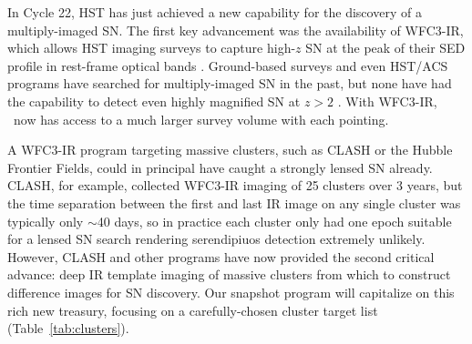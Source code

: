 \medskip
{} In Cycle 22, HST has just achieved a new capability for the discovery of a multiply-imaged SN. The first key advancement was the
availability of WFC3-IR, which allows HST imaging surveys to capture
high-$z$ SN at the peak of their SED profile in rest-frame optical
bands \citep{Rodney:2012,Jones:2013}.  Ground-based surveys and even
HST/ACS programs have searched for multiply-imaged SN in the past, but
none have had the capability to detect even highly magnified SN at
$z>2$ \citep[e.g.][]{Dawson:2009,Sharon:2010,Sand:2011}.  With
WFC3-IR, \Hubble\ now has access to a much larger survey volume with
each pointing.

A WFC3-IR program targeting massive clusters, such as CLASH or the
Hubble Frontier Fields, could in principal have caught a strongly
lensed SN already.  CLASH, for example, collected
WFC3-IR imaging of 25 clusters over 3 years, but the time separation
between the first and last IR image on any single cluster was
typically only $\sim$40 days, so in practice each cluster only had one
epoch suitable for a lensed SN search rendering serendipiuos detection extremely unlikely. 
However, CLASH and other programs have now provided the second critical
advance: deep IR template imaging of massive clusters from which to
construct difference images for SN discovery. Our snapshot program will capitalize on this rich new treasury, focusing on a carefully-chosen cluster target list (Table~\ref{tab:clusters}). 

